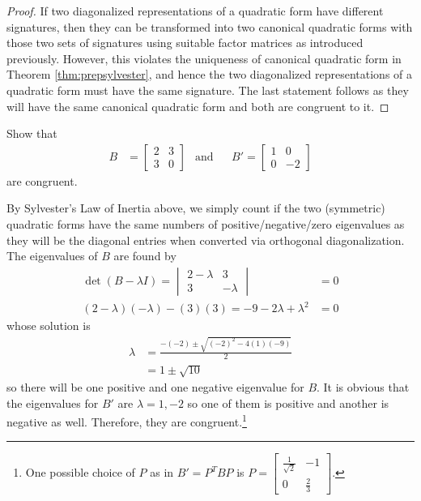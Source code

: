 \begin{proof}
If two diagonalized representations of a quadratic form have different signatures, then they can be transformed into two canonical quadratic forms with those two sets of signatures using suitable factor matrices as introduced previously. However, this violates the uniqueness of canonical quadratic form in Theorem \ref{thm:prepsylvester}, and hence the two diagonalized representations of a quadratic form must have the same signature. The last statement follows as they will have the same canonical quadratic form and both are congruent to it.
\end{proof}

\begin{exmp}
Show that
\begin{align*}
B &= \begin{bmatrix}
2 & 3 \\
3 & 0
\end{bmatrix}
& \text{and} & 
& B' = 
\begin{bmatrix}
1 & 0 \\
0 & -2
\end{bmatrix}
\end{align*}
are congruent.
\end{exmp}
\begin{solution}
By Sylvester's Law of Inertia above, we simply count if the two (symmetric) quadratic forms have the same numbers of positive/negative/zero eigenvalues as they will be the diagonal entries when converted via orthogonal diagonalization. The eigenvalues of $B$ are found by
\begin{align*}
\det(B - \lambda I) = 
\begin{vmatrix}
2 - \lambda & 3 \\
3 & - \lambda
\end{vmatrix} &= 0 \\
(2-\lambda)(-\lambda) - (3)(3) = -9 - 2\lambda + \lambda^2 &= 0
\end{align*}
whose solution is 
\begin{align*}
\lambda &= \frac{-(-2) \pm \sqrt{(-2)^2 - 4(1)(-9)}}{2} \\
&= 1 \pm \sqrt{10}
\end{align*}
so there will be one positive and one negative eigenvalue for $B$. It is obvious that the eigenvalues for $B'$ are $\lambda = 1, -2$ so one of them is positive and another is negative as well. Therefore, they are congruent.\footnote{One possible choice of $P$ as in $B' = P^TBP$ is $P = 
\begin{bmatrix}
\frac{1}{\sqrt{2}}&-1\\ 
0&\frac{2}{3}
\end{bmatrix}$.}
\end{solution}

